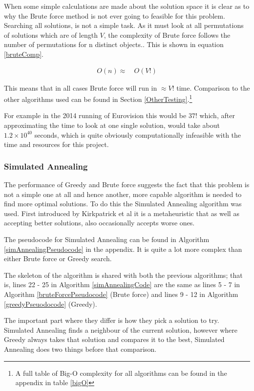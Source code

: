 \documentclass[12pt]{report}
\begin{document}
When some simple calculations are made about the solution space it is clear as to why the Brute force method is not ever going to feasible for this problem. Searching all solutions, is not a simple task. As it must look at all permutations of solutions which are of length $V$, the complexity of Brute force follows the number of permutations for n distinct objects.\cite{Permutation}. This is shown in equation \ref{bruteComp}.

\begin{equation}\label{bruteComp}
\begin{aligned}
	O(n) \approx{} & \ O(V!)
\end{aligned}
\end{equation}

This means that in all cases Brute force will run in $\approx V!$ time. Comparison to the other algorithms used can be found in Section \ref{OtherTesting}.\footnote{A full table of Big-O complexity for all algorithms can be found in the appendix in table \ref{bigO}}

For example in the 2014 running of Eurovision this would be $37!$ which, after approximating the time to look at one single solution, would take about $1.2\times10^{40}$ seconds, which is quite obviously computationally infeasible with the time and resources for this project.

\subsubsection{Simulated Annealing}
The performance of Greedy and Brute force suggests the fact that this problem is not a simple one at all and hence another, more capable algorithm is needed to find more optimal solutions. To do this the Simulated Annealing algorithm was used. First introduced by Kirkpatrick et al\cite{Kirkpatrick} it is a metaheuristic that as well as accepting better solutions, also occasionally accepts worse ones.

The pseudocode for Simulated Annealing can be found in Algorithm \ref{simAnnealingPseudocode} in the appendix. It is quite a lot more complex than either Brute force or Greedy search.

The skeleton of the algorithm is shared with both the previous algorithms; that is, lines 22 - 25 in Algorithm \ref{simAnnealingCode} are the same as lines 5 - 7 in Algorithm \ref{bruteForcePseudocode} (Brute force) and lines 9 - 12 in Algorithm \ref{greedyPseuodocode} (Greedy).

The important part where they differ is how they pick a solution to try. Simulated Annealing finds a neighbour of the current solution, however where Greedy always takes that solution and compares it to the best, Simulated Annealing does two things before that comparison.
\end{document}
